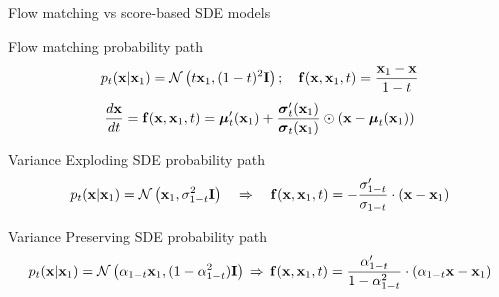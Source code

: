\begin{frame}{Flow matching vs score-based SDE models}
	\begin{block}{Flow matching probability path}
		\vspace{-0.3cm}
		\[
			p_t(\mathbf{x} | \mathbf{x}_1) = \mathcal{N}\left(t \mathbf{x}_1, (1-t)^2 \mathbf{I}\right); \quad \mathbf{f}(\mathbf{x}, \mathbf{x}_1, t) = \frac{\mathbf{x}_1  - \mathbf{x}}{1-t}
		\]
		\vspace{-0.3cm}
		\[
	 		\frac{d\mathbf{x}}{dt} = \mathbf{f}(\mathbf{x}, \mathbf{x}_1, t) =  \boldsymbol{\mu}_t'(\mathbf{x}_1) + \frac{\boldsymbol{\sigma}_t'(\mathbf{x}_1)}{\boldsymbol{\sigma}_t(\mathbf{x}_1)} \odot (\mathbf{x} - \boldsymbol{\mu}_t(\mathbf{x}_1))
		\]
	\end{block}
	\begin{block}{Variance Exploding SDE probability path}
		\vspace{-0.3cm}
		\[
				p_t(\mathbf{x} | \mathbf{x}_1) = \mathcal{N}\left(\mathbf{x}_1, \sigma^2_{1-t}  \mathbf{I}\right) \quad \Rightarrow \quad 
				\mathbf{f}(\mathbf{x}, \mathbf{x}_1, t) = - \frac{\sigma'_{1-t}}{\sigma_{1-t}} \cdot (\mathbf{x} - \mathbf{x}_1)
		\]
		\vspace{-0.3cm}
	\end{block}
	\begin{block}{Variance Preserving SDE probability path}
		\vspace{-0.3cm}
		{\small
		\[
			p_t(\mathbf{x} | \mathbf{x}_1) = \mathcal{N}\left(\alpha_{1-t}  \mathbf{x}_1, (1 - \alpha^2_{1-t})  \mathbf{I} \right)  \, \Rightarrow \, 
		\mathbf{f}(\mathbf{x}, \mathbf{x}_1, t) = \frac{\alpha'_{1-t}}{1 - \alpha^2_{1-t}}\cdot \left(\alpha_{1-t}  \mathbf{x} - \mathbf{x}_1\right)
		\]
		}
	\end{block}
\end{frame}

